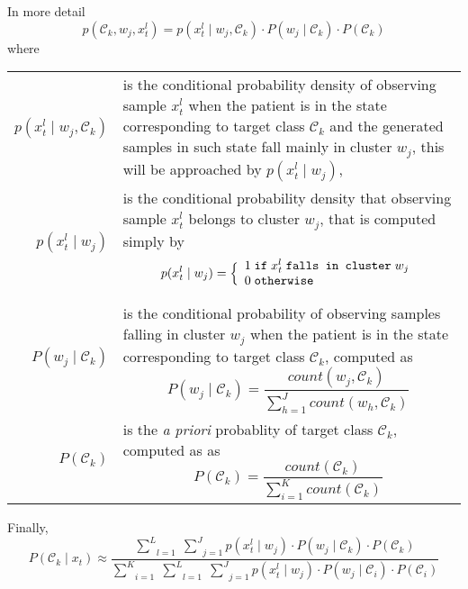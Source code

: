 \documentclass[a4paper,12pt]{article}
\begin{document}
\newpage

In more detail
\[
p(\mathcal{C}_{k}, w_{j}, x_{t}^{l}) =
p(x_{t}^{l} \mid w_{j}, \mathcal{C}_{k}) \cdot P(w_{j} \mid \mathcal{C}_{k}) \cdot P(\mathcal{C}_{k})
\]
where
\begin{center}
\begin{tabular}{rp{110mm}}
$p(x_{t}^{l} \mid w_{j}, \mathcal{C}_{k})$ & is the conditional probability density of observing sample
                                             $x_{t}^{l}$ when the patient is in the state corresponding
                                             to target class $\mathcal{C}_{k}$ and the generated samples
                                             in such state fall mainly in cluster $w_j$,
                                             this will be approached by $p(x_{t}^{l} \mid w_{j})$, \\
$p(x_{t}^{l} \mid w_{j})$ & is the conditional probability density that observing sample $x_{t}^{l}$
                            belongs to cluster $w_{j}$, that is computed simply by
                            $$p(x_{t}^{l} \mid w_{j}) = \Bigl\{ \begin{array}{l} 1 \; \texttt{if} \; x_{t}^{l} \; \texttt{falls in cluster} \; w_{j} \\ 0 \; \texttt{otherwise} \\ \end{array}$$ \\

$P(w_{j} \mid \mathcal{C}_{k})$ & is the conditional probability of observing samples falling in cluster $w_{j}$ when
                                  the patient is in the state corresponding to target class $\mathcal{C}_{k}$, computed
                                  as $$P(w_{j} \mid \mathcal{C}_{k}) = \frac{count(w_{j}, \mathcal{C}_{k})}{\sum_{h=1}^{J} count(w_{h}, \mathcal{C}_{k})}$$ \\

$P(\mathcal{C}_{k})$ & is the \emph{a priori} probablity of target class $\mathcal{C}_{k}$, computed as 
                                  as $$P(\mathcal{C}_{k}) = \frac{count(\mathcal{C}_{k})}{\sum_{i=1}^{K} count(\mathcal{C}_{k})}$$ \\
\end{tabular}
\end{center}

Finally,
\[
P(\mathcal{C}_{k} \mid x_{t}) \approx
    \frac{\underset{l=1}{\overset{L}{\sum}} \; \underset{j=1}{\overset{J}{\sum}}
        p(x_{t}^{l} \mid w_{j}) \cdot P(w_{j} \mid \mathcal{C}_{k}) \cdot P(\mathcal{C}_{k})}%
        {\underset{i=1}{\overset{K}{\sum}} \; \underset{l=1}{\overset{L}{\sum}} \; \underset{j=1}{\overset{J}{\sum}}
            p(x_{t}^{l} \mid w_{j}) \cdot P(w_{j} \mid \mathcal{C}_{i}) \cdot P(\mathcal{C}_{i})}
\]
\end{document}

